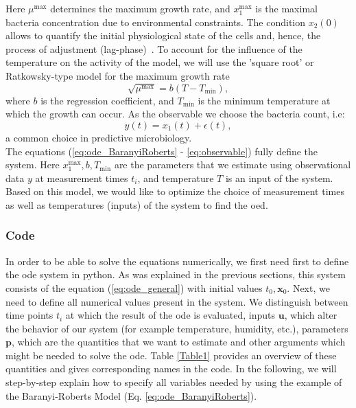 \documentclass[graybox]{svmult}
\newcommand{\mbx}{\mathbf{x}}
\newcommand{\mbu}{\mathbf{u}}
\newcommand{\mbp}{\mathbf{p}}
\begin{document}
Here $\mu^\text{max}$ determines the maximum growth rate, and $x_1^\text{max}$ is the maximal bacteria concentration due to environmental constraints.
The condition $x_2(0)$ allows to quantify the initial physiological state of the cells and, hence, the process of adjustment (lag-phase)~\cite{grijspeerdt_estimating_1999}.
To account for the influence of the temperature on the activity of the model, we will use the 'square root' or Ratkowsky-type model for the maximum growth rate~\cite{ratkowsky_relationship_1982}
\begin{equation}
    \sqrt{\mu^\text{max}} = b (T - T_\text{min}),
    \label{eq:RatkowskyModel}
\end{equation}
where $b$ is the regression coefficient, and $T_\text{min}$ is the minimum temperature at which the growth can occur.
As the observable we choose the bacteria count, i.e:
\begin{equation}
    y(t) = x_1(t)+\epsilon(t),
    \label{eq:observable}
 \end{equation}
a common choice in predictive microbiology.\\
The equations (\ref{eq:ode_BaranyiRoberts} - \ref{eq:observable}) fully define the system.
Here $x_1^\text{max}, b, T_\text{min}$ are the parameters that we estimate using observational data $y$ at measurement times $t_i$, and temperature $T$ is an input of the system.
Based on this model, we would like to optimize the choice of measurement times as well as temperatures (inputs) of the system to find the \acl{oed}.
%
\subsubsection*{Code}
In order to be able to solve the equations numerically, we first need first to define the \ac{ode} system in python.
As was explained in the previous sections, this system consists of the equation (\ref{eq:ode_general}) with initial values $t_0, \mbx_0$.
Next, we need to define all numerical values present in the system.
We distinguish between time points $t_i$ at which the result of the \ac{ode} is evaluated, inputs $\mbu$, which alter the behavior of our system (for example temperature, humidity, etc.), parameters $\mbp$, which are the quantities that we want to estimate and other arguments which might be needed to solve the \ac{ode}.
Table \ref{Table1} provides an overview of these quantities and gives corresponding names in the code.
In the following, we will step-by-step explain how to specify all variables needed by using the example of the Baranyi-Roberts Model (Eq. \ref{eq:ode_BaranyiRoberts}).
\end{document}
